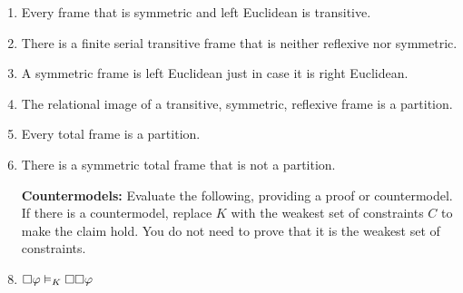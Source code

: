 \documentclass[a4paper, 11pt]{article}                  %
\begin{document}
\begin{enumerate}
	\item Every frame that is symmetric and left Euclidean is transitive.

	\item There is a finite serial transitive frame that is neither reflexive nor symmetric.

	\item A symmetric frame is left Euclidean just in case it is right Euclidean.

	\item The relational image of a transitive, symmetric, reflexive frame is a partition.

	\item Every total frame is a partition.

	\item There is a symmetric total frame that is not a partition.

	\item[\bf Countermodels:] Evaluate the following, providing a proof or countermodel.
	      If there is a countermodel, replace $K$ with the weakest set of constraints $C$ to make the claim hold.
	      You do not need to prove that it is the weakest set of constraints.

	\item $\Box \metaA \MLmodels[K] \Box\Box \metaA$


\end{enumerate}
\end{document}
